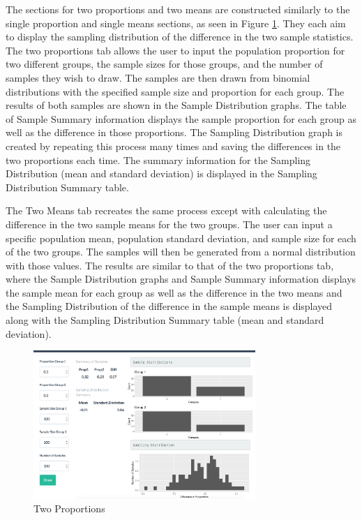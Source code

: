 \documentclass[11pt]{book}
\begin{document}
The sections for two proportions and two means are constructed similarly to the single proportion and single means sections, as seen in Figure \ref{fig:TwoProp}.  They each aim to display the sampling distribution of the difference in the two sample statistics. The two proportions tab allows the user to input the population proportion for two different groups, the sample sizes for those groups, and the number of samples they wish to draw. The samples are then drawn from binomial distributions with the specified sample size and proportion for each group. The results of both samples are shown in the Sample Distribution graphs. The table of Sample Summary information displays the sample proportion for each group as well as the difference in those proportions. The Sampling Distribution graph is created by repeating this process many times and saving the differences in the two proportions each time. The summary information for the Sampling Distribution (mean and standard deviation) is displayed in the Sampling Distribution Summary table.

The Two Means tab recreates the same process except with calculating the difference in the two sample means for the two groups. The user can input a specific population mean, population standard deviation, and sample size for each of the two groups. The samples will then be generated from a normal distribution with those values. The results are similar to that of the two proportions tab, where the Sample Distribution graphs and Sample Summary information displays the sample mean for each group as well as the difference in the two means and the Sampling Distribution of the difference in the sample means is displayed along with the Sampling Distribution Summary table (mean and standard deviation). 

\begin{figure}
\centering
        \includegraphics[width=0.75\textwidth]{TwoProp.png}
        \caption{Two Proportions} 
        \label{fig:TwoProp}
\end{figure}
\end{document}
